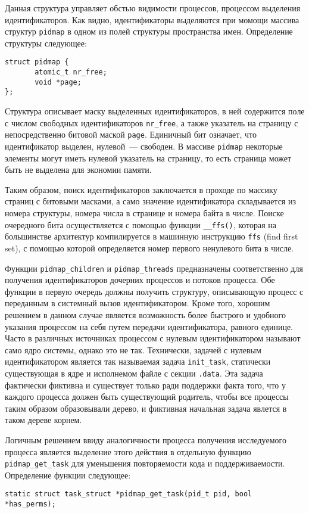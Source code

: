 Данная структура управляет обстью видимости процессов, процессом выделения
идентификаторов. Как видно, идентификаторы выделяются при момощи массива
структур \texttt{pidmap} в одном из полей структуры пространства имен.
Определение структуры следующее:
\medskip
\begin{lstlisting}[style=cstyle]
struct pidmap {
       atomic_t nr_free;
       void *page;
};
\end{lstlisting}
\medskip

Структура описывает маску выделенных идентификаторов, в ней содержится поле с
числом свободных идентификаторов \texttt{nr\_free}, а также указатель на
страницу с непосредственно битовой маской \texttt{page}. Единичный бит означает,
что идентификатор выделен, нулевой~--- свободен. В массиве \texttt{pidmap}
некоторые элементы могут иметь нулевой указатель на страницу, то есть страница
может быть не выделена для экономии памяти.

Таким образом, поиск идентификаторов заключается в проходе по массику страниц с
битовыми масками, а само значение идентификатора складывается из номера
структуры, номера числа в странице и номера байта в числе. Поиске очередного
бита осуществляется с помощью функции \texttt{\_\_ffs()}, которая на большинстве
архитектур компилируется в машинную инструкцию \texttt{ffs} (find first set), с
помощью которой определяется номер первого ненулевого бита в числе.

Функции \texttt{pidmap\_children} и \texttt{pidmap\_threads} предназначены
соответственно для получения идентификаторов дочерних процессов и потоков
процесса. Обе функции в первую очередь должны получить структуру, описывающую
процесс с переданным в системный вызов идентификатором. Кроме того, хорошим
решением в данном случае является возможность более быстрого и удобного указания
процессом на себя путем передачи идентификатора, равного единице. Часто в
различных источниках процессом с нулевым идентификатором называют само ядро
системы, однако это не так. Технически, задачей с нулевым идентификатором
является так называемая задача \texttt{init\_task}, статически существующая в
ядре и исполнемом файле с секции \texttt{.data}. Эта задача фактически фиктивна
и существует только ради поддержки факта того, что у каждого процесса должен
быть существующий родитель, чтобы все процессы таким образом образовывали
дерево, и фиктивная начальная задача явлется в таком дереве корнем.

Логичным решением ввиду аналогичности процесса получения исследуемого процесса
является выделение этого действия в отдельную функцию \texttt{pidmap\_get\_task}
для уменьшения повторяемости кода и поддерживаемости. Определение функции
следующее:
\medskip
\begin{lstlisting}[style=cstyle]
static struct task_struct *pidmap_get_task(pid_t pid, bool *has_perms);
\end{lstlisting}
\medskip

